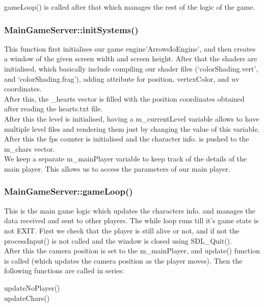 \documentclass{article}
\begin{document}
gameLoop() is called after that which manages the rest of the logic of the game.
\newline

\subsubsection{MainGameServer::initSystems() }
This function first initialises our game engine’ArrowsIoEngine’, and then creates a window of the given screen width and screen height. After that the shaders are initialised, which basically include compiling our shader files (‘colorShading.vert’, and ‘colorShading.frag’), adding attribute for position, vertexColor, and uv coordinates. \\

After this, the \_hearts vector is filled with the position coordinates obtained after reading the hearts.txt file. \\

After this the level is initialised, having a m\_currentLevel variable allows to have multiple level files and rendering them just by changing the value of this variable. After this the fps counter is initialised and the character info. is pushed to the m\_chars vector. \\

We keep a separate m\_mainPlayer variable to keep track of the details of the main player. This allows us to access the parameters of our main player.
\newline

\subsubsection{MainGameServer::gameLoop() }

This is the main game logic which updates the characters info. and manages the data received and sent to other players. The while loop runs till it’s game state is not EXIT. First we check that the player is still alive or not, and if not the processInput() is not called and the window is closed using SDL\_Quit(). \\

After this the camera position is set to the m\_mainPlayer, and update() function is called (which updates the camera position as the player moves). Then the following functions are called in series:
\newline

updateNoPlayer() \\
updateChars() \\
\end{document}
